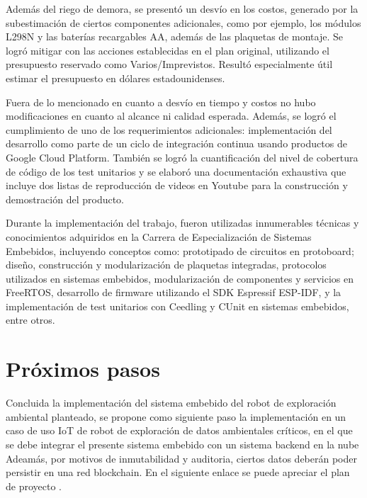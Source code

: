 Además del riego de demora, se presentó un desvío en los costos, generado por la subestimación de ciertos componentes adicionales, como por ejemplo, los módulos L298N y las baterías recargables AA, además de las plaquetas de montaje. Se logró mitigar con las acciones establecidas en el plan original, utilizando el presupuesto reservado como Varios/Imprevistos. Resultó especialmente útil estimar el presupuesto en dólares estadounidenses.


Fuera de lo mencionado en cuanto a desvío en tiempo y costos no hubo modificaciones en cuanto al alcance ni calidad esperada. Además, se logró el cumplimiento de uno de los requerimientos adicionales: implementación del desarrollo como parte de un ciclo de integración continua usando productos de Google Cloud Platform. También se logró la cuantificación del nivel de cobertura de código de los test unitarios y se elaboró una documentación exhaustiva que incluye dos listas de reproducción de videos en Youtube para la construcción y demostración del producto.


Durante la implementación del trabajo, fueron utilizadas innumerables técnicas y conocimientos adquiridos en la Carrera de Especialización de Sistemas Embebidos, incluyendo conceptos como: prototipado de circuitos en protoboard; diseño, construcción y modularización de plaquetas integradas, protocolos utilizados en sistemas embebidos, modularización de componentes y servicios en FreeRTOS, desarrollo de firmware utilizando el SDK Espressif ESP-IDF, y la implementación de test unitarios con Ceedling y CUnit en sistemas embebidos, entre otros.





\section{Próximos pasos}

Concluida la implementación del sistema embebido del robot de exploración ambiental planteado, se propone como siguiente paso la implementación en un caso de uso IoT de robot de exploración de datos ambientales críticos, en el que se debe integrar el presente sistema embebido con un sistema backend en la nube Adeamás, por motivos de inmutabilidad y auditoria, ciertos datos deberán poder persistir en una red blockchain. En el siguiente enlace se puede apreciar el plan de proyecto \cite{Robot_CEIOT_Planificacion_doc}.